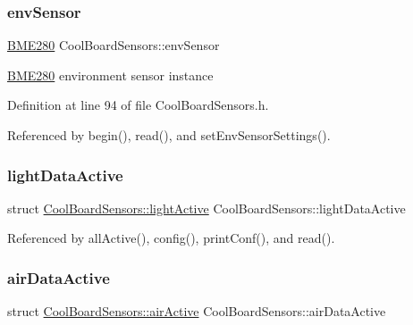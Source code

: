 \mbox{\label{class_cool_board_sensors_a868e38985e9a2412829fa2790ca13e2e}} 
\subsubsection{\texorpdfstring{env\+Sensor}{envSensor}}
{\footnotesize\ttfamily \hyperlink{class_b_m_e280}{B\+M\+E280} Cool\+Board\+Sensors\+::env\+Sensor}

\hyperlink{class_b_m_e280}{B\+M\+E280} environment sensor instance 

Definition at line 94 of file Cool\+Board\+Sensors.\+h.



Referenced by begin(), read(), and set\+Env\+Sensor\+Settings().

\mbox{\label{class_cool_board_sensors_ac4deb1cf41bac8b91c780c92fab00ba4}} 
\subsubsection{\texorpdfstring{light\+Data\+Active}{lightDataActive}}
{\footnotesize\ttfamily struct \hyperlink{class_cool_board_sensors_df/da3/struct_cool_board_sensors_1_1light_active}{Cool\+Board\+Sensors\+::light\+Active} Cool\+Board\+Sensors\+::light\+Data\+Active\hspace{0.3cm}{\ttfamily [private]}}



Referenced by all\+Active(), config(), print\+Conf(), and read().

\mbox{\label{class_cool_board_sensors_abff8dfeccb2f7689847bb64d5f1cd31e}} 
\subsubsection{\texorpdfstring{air\+Data\+Active}{airDataActive}}
{\footnotesize\ttfamily struct \hyperlink{class_cool_board_sensors_d7/db6/struct_cool_board_sensors_1_1air_active}{Cool\+Board\+Sensors\+::air\+Active} Cool\+Board\+Sensors\+::air\+Data\+Active\hspace{0.3cm}{\ttfamily [private]}}




